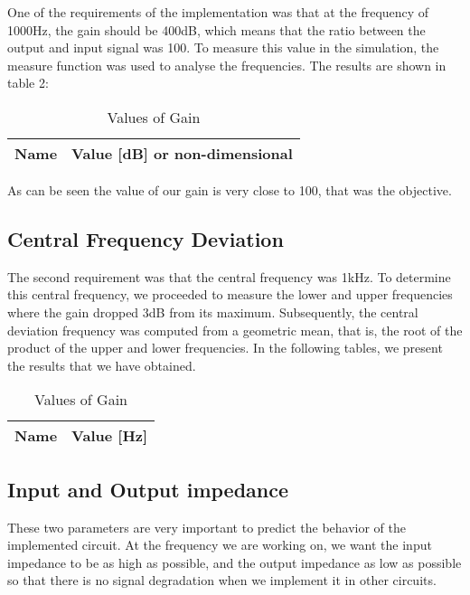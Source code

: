 One of the requirements of the implementation was that at the frequency of 1000Hz, the gain should be 400dB, which means that the ratio between the output and input signal was 100. To measure this value in the simulation, the measure function was used to analyse the frequencies. The results are shown in table 2: 

\begin{table}[H]
  \centering
  \begin{tabular}{|l|r|}
    \hline    
    {\bf Name} & {\bf Value [dB] or non-dimensional} \\ \hline
    
  \end{tabular}
  \caption{Values of Gain}
  \label{tab:r}
\end{table}

As can be seen the value of our gain is very close to 100, that was the objective.


\subsection{Central Frequency Deviation}

The second requirement was that the central frequency was 1kHz. To determine this central frequency, we proceeded to measure the lower and upper frequencies where the gain dropped 3dB from its maximum. Subsequently, the central deviation frequency was computed from a geometric mean, that is, the root of the product of the upper and lower frequencies. In the following tables, we present the results that we have obtained.

\begin{table}[H]
  \centering
  \begin{tabular}{|l|r|}
    \hline    
    {\bf Name} & {\bf Value [Hz] } \\ \hline
    
  \end{tabular}
  \caption{Values of Gain}
  \label{tab:r}
\end{table}


\subsection{Input and Output impedance}

These two parameters are very important to predict the behavior of the implemented circuit.
At the frequency we are working on, we want the input impedance to be as high as possible, and the output impedance as low as possible so that there is no signal degradation when we implement it in other circuits. 


